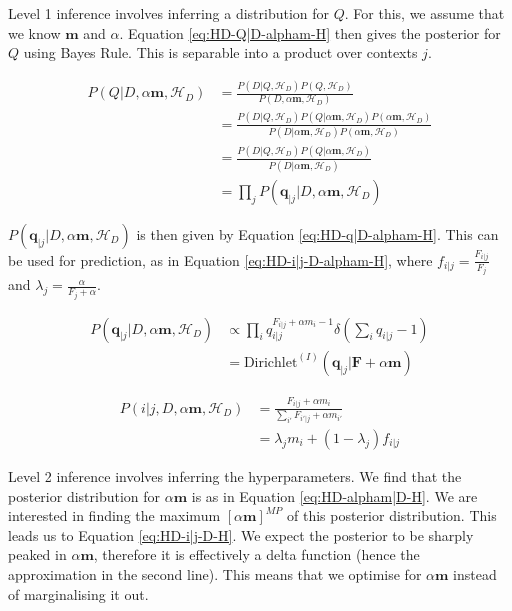 Level 1 inference involves inferring a distribution for $Q$. For this, we assume that we know $\boldsymbol{m}$ and $\alpha$. Equation \ref{eq:HD-Q|D-alpham-H} then gives the posterior for $Q$ using Bayes Rule. This is separable into a product over contexts $j$.

\begin{align}
P(Q|D,\alpha\boldsymbol{m},\mathscr{H}_{D})&=\frac{P(D|Q,\mathscr{H}_{D})P(Q,\mathscr{H}_{D})}{P(D,\alpha \boldsymbol{m},\mathscr{H}_{D})}\nonumber
\\
&=\frac{P(D|Q,\mathscr{H}_{D})P(Q|\alpha\boldsymbol{m},\mathscr{H}_{D})P(\alpha\boldsymbol{m},\mathscr{H}_{D})}{P(D|\alpha\boldsymbol{m},\mathscr{H}_{D})P(\alpha\boldsymbol{m},\mathscr{H}_{D})}\nonumber
\\
&=\frac{P(D|Q,\mathscr{H}_{D})P(Q|\alpha\boldsymbol{m},\mathscr{H}_{D})}{P(D|\alpha\boldsymbol{m},\mathscr{H}_{D})} \nonumber
\\
&=\prod_{j}P(\boldsymbol{q}_{|j}|D,\alpha\boldsymbol{m},\mathscr{H}_{D})
\label{eq:HD-Q|D-alpham-H}
\end{align}

\noindent $P(\boldsymbol{q}_{|j}|D,\alpha\boldsymbol{m},\mathscr{H}_{D})$ is then given by Equation \ref{eq:HD-q|D-alpham-H}. This can be used for prediction, as in Equation \ref{eq:HD-i|j-D-alpham-H}, where $f_{i|j}=\frac{F_{i|j}}{F_{j}}$ and $\lambda_{j}=\frac{\alpha}{F_{j}+\alpha}$.


\begin{align}
P(\boldsymbol{q}_{|j}|D,\alpha\boldsymbol{m},\mathscr{H}_{D})&\propto\prod_{i}q_{i|j}^{F_{i|j}+\alpha m_{i}-1}\delta(\sum_{i}q_{i|j}-1) \nonumber
\\
&=\text{Dirichlet}^{(I)}(\boldsymbol{q}_{|j}|\boldsymbol{F}+\alpha\boldsymbol{m})
\label{eq:HD-q|D-alpham-H}
\end{align}

\begin{align}
P(i|j,D,\alpha\boldsymbol{m},\mathscr{H}_{D})&=\frac{F_{i|j}+\alpha m_{i}}{\sum_{i'}F_{i'|j}+\alpha m_{i'}} \nonumber
\\
&=\lambda_{j}m_{i}+(1-\lambda_{j})f_{i|j}
\label{eq:HD-i|j-D-alpham-H}
\end{align}

Level 2 inference involves inferring the hyperparameters. We find that the posterior distribution for $\alpha\boldsymbol{m}$ is as in Equation \ref{eq:HD-alpham|D-H}. We are interested in finding the maximum $[\alpha\boldsymbol{m}]^{MP}$ of this posterior distribution. This leads us to Equation \ref{eq:HD-i|j-D-H}. We expect the posterior to be sharply peaked in $\alpha\boldsymbol{m}$, therefore it is effectively a delta function (hence the approximation in the second line). This means that we optimise for $\alpha\boldsymbol{m}$ instead of marginalising it out. 

